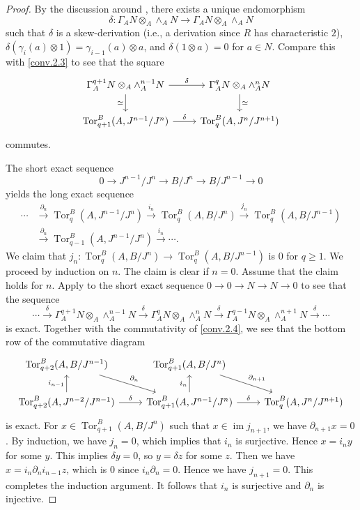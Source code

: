 \documentclass[10pt]{amsart}
\theoremstyle{definition}
\numberwithin{equation}{section}
\DeclareMathOperator{\im}{im}
\DeclareMathOperator{\Tor}{\mathrm{Tor}}
\begin{document}
{\begin{proof}
By the discussion around \cite[(7.39)]{Qui},
there exists a unique endomorphism
\[
\delta\colon \Gamma_A N \otimes_A \wedge_A N
\to
\Gamma_A N \otimes_A \wedge_A N
\]
such that $\delta$ is a skew-derivation (i.e., a derivation since $R$ has characteristic $2$), $\delta(\gamma_i(a)\otimes 1)=\gamma_{i-1}(a)\otimes a$, and $\delta(1\otimes a)=0$ for $a\in N$.
Compare this with \eqref{conv.2.3} to see that the square
\begin{equation}
\label{conv.2.4}
\begin{tikzcd}
\Gamma^{q+1}_A N\otimes_A \wedge_A^{n-1}N\ar[d,"\simeq"']\ar[r,"\delta"]&
\Gamma^q_A N\otimes_A \wedge_A^n N\ar[d,"\simeq"]
\\
\Tor_{q+1}^B(A,J^{n-1}/J^n)\ar[r,"\delta"]&
\Tor_q^B(A,J^n/J^{n+1})
\end{tikzcd}
\end{equation}
commutes.

The short exact sequence
\[
0
\to
J^{n-1}/J^n
\to
B/J^n
\to
B/J^{n-1}
\to
0
\]
yields the long exact sequence
\begin{align*}
\cdots
&\xrightarrow{\partial_{n}}
\Tor_{q}^B(A,J^{n-1}/J^n)
\xrightarrow{i_{n}}
\Tor_{q}^B(A,B/J^n)
\xrightarrow{j_{n}}
\Tor_{q}^B(A,B/J^{n-1})
\\
&\xrightarrow{\partial_{n}}
\Tor_{q-1}^B(A,J^{n-1}/J^n)
\xrightarrow{i_{n}}
\cdots.
\end{align*}
We claim that $j_{n}\colon \Tor_{q}^B(A,B/J^n)\to \Tor_{q}^B(A,B/J^{n-1})$ is $0$ for $q\geq 1$.
We proceed by induction on $n$.
The claim is clear if $n=0$.
Assume that the claim holds for $n$.
Apply \cite[\S 4.3.1.7]{MR0491680} to the short exact sequence $0\to 0\to N\to N\to 0$ to see that the sequence
\begin{equation}
\label{conv.2.5}
\cdots
\xrightarrow{\delta}
\Gamma_A^{q+1} N \otimes_A \wedge_A^{n-1} N
\xrightarrow{\delta}
\Gamma_A^q N \otimes_A \wedge_A^n N
\xrightarrow{\delta}
\Gamma_A^{q-1}N\otimes_A \wedge_A^{n+1} N
\xrightarrow{\delta}
\cdots
\end{equation}
is exact.
Together with the commutativity of \eqref{conv.2.4},
we see that the bottom row of the commutative diagram
\[
\begin{tikzcd}
\Tor_{q+2}^B(A,B/J^{n-1})\ar[d,leftarrow,"i_{n-1}"']\ar[rd,"\partial_n"]&
\Tor_{q+1}^B(A,B/J^{n})\ar[d,leftarrow,"i_{n}"']\ar[rd,"\partial_{n+1}"]
\\
\Tor_{q+2}^B(A,J^{n-2}/J^{n-1})\ar[r,"\delta"]&
\Tor_{q+1}^B(A,J^{n-1}/J^n)\ar[r,"\delta"]&
\Tor_{q}^B(A,J^n/J^{n+1})
\end{tikzcd}
\]
is exact.
For $x\in \Tor_{q+1}^B(A,B/J^n)$ such that $x\in \im j_{n+1}$,
we have $\partial_{n+1}x=0$.
By induction, we have $j_{n}=0$,
which implies that $i_{n}$ is surjective.
Hence $x=i_{n}y$ for some $y$.
This implies $\delta y=0$,
so $y=\delta z$ for some $z$.
Then we have $x=i_{n}\partial_n i_{n-1}z$, which is $0$ since $i_n\partial_n=0$.
Hence we have $j_{n+1}=0$.
This completes the induction argument.
It follows that $i_n$ is surjective and $\partial_n$ is injective.


\end{proof}}
\end{document}
